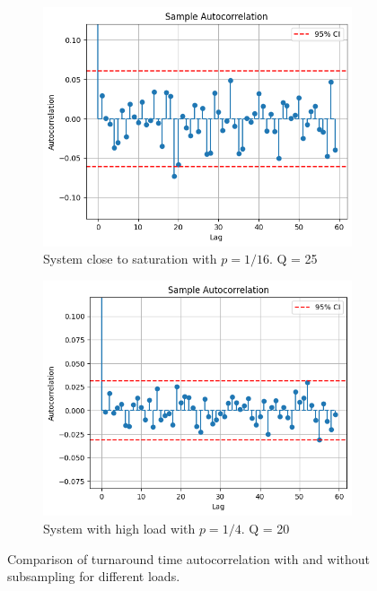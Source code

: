 \begin{figure}[H]
    \vspace{10pt} %
    
    \begin{subfigure}[b]{0.45\textwidth}
        \includegraphics[width=\textwidth]{./images/04/autoCorHighFix.png}
        \caption{System close to saturation with $p=1/16$. Q = 25}
        \label{fig:autoCorHighFix}
    \end{subfigure}
    \hfill %
    \begin{subfigure}[b]{0.45\textwidth}
        \includegraphics[width=\textwidth]{./images/04/autoCorLowFix.png}
        \caption{System with high load with $p=1/4$. Q = 20}
        \label{fig:autoCorLowFix}
    \end{subfigure}
    
    \vspace{10pt} %
    \caption{Comparison of turnaround time autocorrelation with and without subsampling for different loads.}
    \label{fig:autoCorComparison}
\end{figure}

